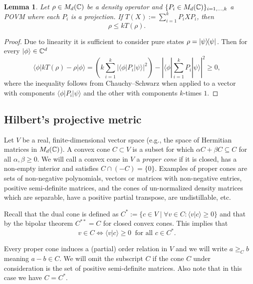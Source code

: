 \documentclass[11pt,a4paper]{article}
\theoremstyle{plain}
\newtheorem{lemma}{Lemma}[section]
\theoremstyle{definition}
\theoremstyle{remark}
\begin{document}
\begin{lemma}
    Let $\rho\in M_d(\mathbb{C})$ be a density operator and $\{P_i\in M_d(\mathbb{C})\}_{i=1,\dots,k}$ a POVM where each $P_i$ is a projection.
    If $T(X):=\sum_{i=1}^k P_i X P_i$, then
    \begin{equation}\tag{8.56}
        \rho \le kT(\rho).
    \end{equation}
\end{lemma}

\begin{proof}
    Due to linearity it is sufficient to consider pure states $\rho=|\psi\rangle\!\langle\psi|$. Then for every $|\phi\rangle\in\mathbb{C}^d$
    \begin{equation}\tag{8.57}
        \langle\phi|kT(\rho)-\rho|\phi\rangle
        =
        \left(k\sum_{i=1}^k |\langle\phi|P_i|\psi\rangle|^2\right)
        -\left|\langle\phi|\sum_{i=1}^k P_i|\psi\rangle\right|^2
        \ge 0,
    \end{equation}
    where the inequality follows from Chauchy--Schwarz when applied to a vector
    with components $\langle\phi|P_i|\psi\rangle$ and the other with components $k$-times $1$.
\end{proof}

\subsection{Hilbert's projective metric}

Let $V$ be a real, finite-dimensional vector space (e.g., the space of Hermitian matrices in $M_d(\mathbb{C})$).
A convex cone $C\subset V$ is a subset for which $\alpha C+\beta C\subseteq C$ for all $\alpha,\beta\ge 0$.
We will call a convex cone in $V$ a \emph{proper cone} if it is closed, has a non-empty interior and satisfies $C\cap(-C)=\{0\}$.
Examples of proper cones are sets of non-negative polynomials, vectors or matrices with non-negative entries,
positive semi-definite matrices, and the cones of un-normalized density matrices which are separable,
have a positive partial transpose, are undistillable, etc.

Recall that the dual cone is defined as $C^\ast := \{c\in V\mid \forall v\in C:\langle v|c\rangle\ge 0\}$ and
that by the bipolar theorem $C^{\ast\ast}=C$ for closed convex cones. This implies that
\begin{equation}\tag{8.58}
    v\in C \iff \langle v|c\rangle\ge 0\ \text{ for all }c\in C^\ast.
\end{equation}

Every proper cone induces a (partial) order relation in $V$ and we will write $a\ge_C b$ meaning $a-b\in C$.
We will omit the subscript $C$ if the cone $C$ under consideration is the set of positive semi-definite matrices.
Also note that in this case we have $C=C^\ast$.
\end{document}
